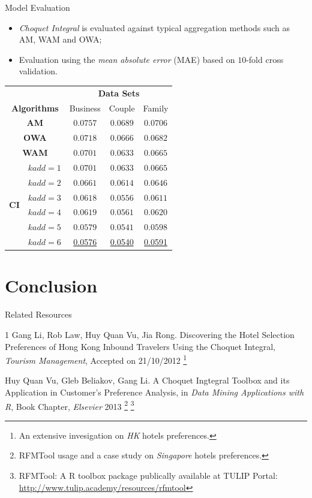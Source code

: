\documentclass[
 size=12pt,
 paper=smartboard,  %
 mode=present, 		%
 display=slides, 	%
 style=tuliplab,  	%
 pauseslide,
 fleqn,leqno]{powerdot}
\begin{document}
\begin{slide}[toc=,bm=]{Model Evaluation}
\begin{itemize}
 \item<1-> \emph{Choquet Integral} is evaluated against typical aggregation methods such as AM, WAM and OWA;
 \item<2-> Evaluation using the \emph{mean absolute  error} (MAE) based on $10$-fold cross validation.
\end{itemize}
{ \footnotesize \centering
\begin{tabular}{c c c c c}
\toprule
&   &\multicolumn{3}{c}{\textbf{Data Sets}}\\
\multicolumn{2}{c}{\textbf{Algorithms}}   & Business  & Couple & Family     \\
\midrule
\multicolumn{2}{c}{\textbf{AM}}    &$0.0757$ & $0.0689$& $0.0706$ \\
\multicolumn{2}{c}{\textbf{OWA}}     &$0.0718$ & $0.0666$& $0.0682$ \\
\multicolumn{2}{c}{\textbf{WAM}}    &$0.0701$ & $0.0633$& $0.0665$ \\
\midrule
\multirow{6}{*}{\textbf{CI}}
& $kadd = 1$ &     $0.0701$ & $0.0633$& $0.0665$ \\
& $kadd = 2$ &    $0.0661$ & $0.0614$& $0.0646$ \\
& $kadd = 3$ &     $0.0618$ & $0.0556$& $0.0611$ \\
& $kadd = 4$ &     $0.0619$ & $0.0561$& $0.0620$ \\
& $kadd = 5$ &     $0.0579$ & $0.0541$& $0.0598$ \\
& $kadd = 6$ &     \underline{0.0576} & \underline{0.0540}& \underline{0.0591} \\
\bottomrule
\end{tabular}
}
\end{slide}

\section{Conclusion}


\begin{slide}[toc=,bm=]{Related Resources}
\begin{thebibliography}{1}
 Gang Li, Rob Law, Huy Quan Vu, Jia Rong. 
Discovering the Hotel Selection Preferences of Hong Kong Inbound Travelers Using the Choquet Integral, 
\emph{Tourism Management}, Accepted on 21/10/2012
\footnote{An extensive invesigation on \emph{HK} hotels preferences.}

 Huy Quan Vu, Gleb Beliakov, Gang Li. 
A Choquet Ingtegral Toolbox and its Application in Customer's Preference Analysis, 
in \emph{Data Mining Applications with R}, Book Chapter, \emph{Elsevier} 2013
\footnote{RFMTool usage and a case study on \emph{Singapore} hotels preferences.}
\footnote{RFMTool: A R toolbox package publically available at TULIP Portal: \url{http://www.tulip.academy/resources/rfmtool}}
\end{thebibliography}
\end{slide}
\end{document}
